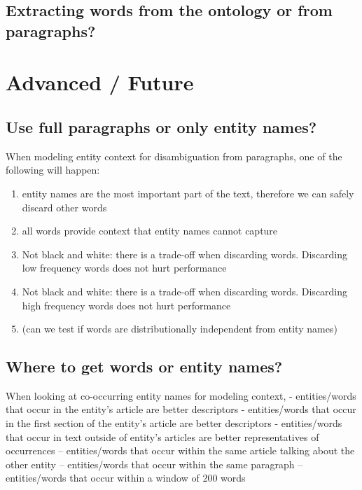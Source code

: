 \documentclass[10pt,a4paper]{article}
\begin{document}
\subsection{Extracting words from the ontology or from paragraphs?}


\section{Advanced / Future}

\subsection{Use full paragraphs or only entity names?}
When modeling entity context for disambiguation from paragraphs, one of the following will happen:
\begin{enumerate}
\item entity names are the most important part of the text, therefore we can safely discard other words 
\item all words provide context that entity names cannot capture
\item Not black and white: there is a trade-off when discarding words. Discarding low frequency words does not hurt performance
\item Not black and white: there is a trade-off when discarding words. Discarding high frequency words does not hurt performance
\item (can we test if words are distributionally independent from entity names)
\end{enumerate}

\subsection{Where to get words or entity names?}
When looking at co-occurring entity names for modeling context,
- entities/words that occur in the entity's article are better descriptors
- entities/words that occur in the first section of the entity's article are better descriptors
- entities/words that occur in text outside of entity's articles are better representatives of occurrences
-- entities/words that occur within the same article talking about the other entity
-- entities/words that occur within the same paragraph
-- entities/words that occur within a window of 200 words
\end{document}
